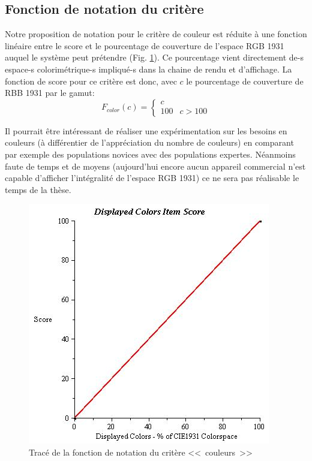 	\subsection{Fonction de notation du critère}
	\par Notre proposition de notation pour le critère de couleur est réduite à une fonction linéaire entre le score et le pourcentage de couverture de l'espace RGB 1931 auquel le système peut prétendre (Fig. \ref{fig:score_color}). Ce pourcentage vient directement de-s espace-s colorimétrique-s impliqué-s dans la chaine de rendu et d'affichage. La fonction de score pour ce critère est donc, avec $c$ le pourcentage de couverture de RBB 1931 par le gamut:
	 \begin{equation}
		F_{color}(c) = \begin{cases}
		c &\\
		100 & c > 100
		\end{cases}
		\label{eq:color}
	\end{equation}
	
	\par Il pourrait être intéressant de réaliser une expérimentation sur les besoins en couleurs (à différentier de l'appréciation du nombre de couleurs) en comparant par exemple des populations novices avec des populations expertes. Néanmoins faute de temps et de moyens (aujourd'hui encore aucun appareil commercial n'est capable d'afficher l'intégralité de l'espace RGB 1931) ce ne sera pas réalisable le temps de la thèse.
	
	\begin{figure}
		\centering
		\includegraphics[scale=1]{Figures/Color}
		\caption{Tracé de la fonction de notation du critère <<~couleurs~>>}
		\label{fig:score_color}
	\end{figure}
	
